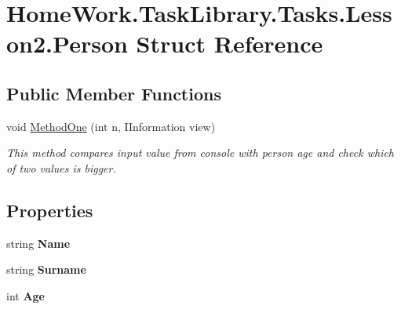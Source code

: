 \hypertarget{struct_home_work_1_1_task_library_1_1_tasks_1_1_lesson2_1_1_person}{}\section{Home\+Work.\+Task\+Library.\+Tasks.\+Lesson2.\+Person Struct Reference}
\label{struct_home_work_1_1_task_library_1_1_tasks_1_1_lesson2_1_1_person}
\subsection*{Public Member Functions}
\begin{DoxyCompactItemize}
\item 
void \mbox{\hyperlink{struct_home_work_1_1_task_library_1_1_tasks_1_1_lesson2_1_1_person_ab836c6c8d008fc2ef5a5ff5e3f715fae}{Method\+One}} (int n, I\+Information view)
\begin{DoxyCompactList}\small\item\em This method compares input value from console with person age and check which of two values is bigger. \end{DoxyCompactList}\end{DoxyCompactItemize}
\subsection*{Properties}
\begin{DoxyCompactItemize}
\item 
\mbox{\label{struct_home_work_1_1_task_library_1_1_tasks_1_1_lesson2_1_1_person_ac06e4d33a6434b0b4e7c80f28dca99c8}} 
string {\bfseries Name}
\item 
\mbox{\label{struct_home_work_1_1_task_library_1_1_tasks_1_1_lesson2_1_1_person_a940d97bfb294b9624f1dd72d2c323d87}} 
string {\bfseries Surname}
\item 
\mbox{\label{struct_home_work_1_1_task_library_1_1_tasks_1_1_lesson2_1_1_person_a969041d897c7d8fd76c8643cebd04b6b}} 
int {\bfseries Age}
\end{DoxyCompactItemize}


